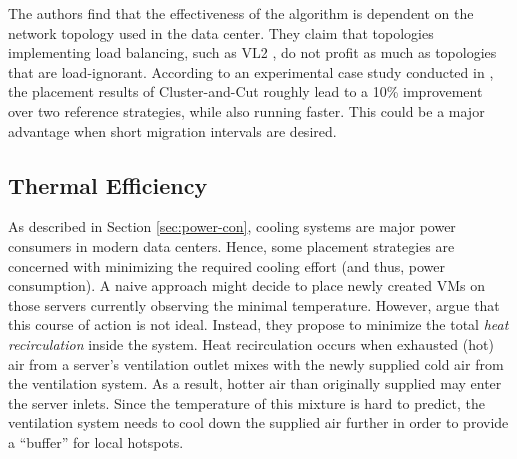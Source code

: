 \documentclass[12pt, a4paper]{scrartcl}
\begin{document}
The authors find that the effectiveness of the algorithm is dependent on the network topology used in the data center.
They claim that topologies implementing load balancing, such as VL2 \cite{greenberg_vl2_2011}, do not profit as much as topologies that are load-ignorant.
According to an experimental case study conducted in \cite{meng_traffic_aware_2010}, the placement results of Cluster-and-Cut roughly lead to a 10\% improvement over two reference strategies, while also running faster.
This could be a major advantage when short migration intervals are desired.

\subsection{Thermal Efficiency}
As described in Section \ref{sec:power-con}, cooling systems are major power consumers in modern data centers.
Hence, some placement strategies are concerned with minimizing the required cooling effort (and thus, power consumption).
A naive approach might decide to place newly created \acp{VM} on those servers currently observing the minimal temperature.
However, \textcite{tang_thermal_aware_2007} argue that this course of action is not ideal.
Instead, they propose to minimize the total \emph{heat recirculation} inside the system.
Heat recirculation occurs when exhausted (hot) air from a server's ventilation outlet mixes with the newly supplied cold air from the ventilation system.
As a result, hotter air than originally supplied may enter the server inlets.
Since the temperature of this mixture is hard to predict, the ventilation system needs to cool down the supplied air further in order to provide a \enquote{buffer} for local hotspots.
\end{document}
